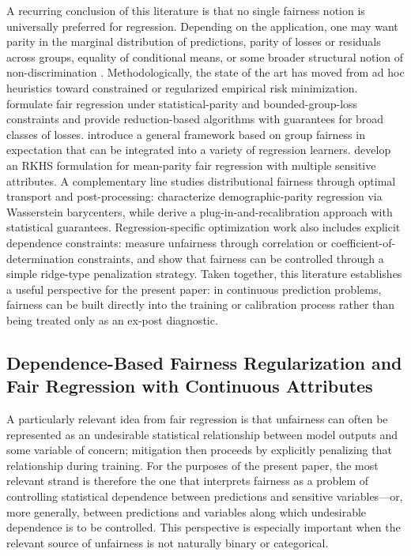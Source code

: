 \documentclass[12pt, draft]{article}
\theoremstyle{plain}
\theoremstyle{definition}
\newcommand{\1}{\mathbf{1}}
\begin{document}
A recurring conclusion of this literature is that no single fairness notion is universally preferred for regression. Depending on the application, one may want parity in the marginal distribution of predictions, parity of losses or residuals across groups, equality of conditional means, or some broader structural notion of non-discrimination \cite{AgarwalDudikWu2019,CatonHaas2024,BarocasHardtNarayanan2023}. Methodologically, the state of the art has moved from ad hoc heuristics toward constrained or regularized empirical risk minimization. \textcite{AgarwalDudikWu2019} formulate fair regression under statistical-parity and bounded-group-loss constraints and provide reduction-based algorithms with guarantees for broad classes of losses. \textcite{FitzsimonsEtAl2019} introduce a general framework based on group fairness in expectation that can be integrated into a variety of regression learners. \textcite{WeiEtAl2023} develop an RKHS formulation for mean-parity fair regression with multiple sensitive attributes. A complementary line studies distributional fairness through optimal transport and post-processing: \textcite{ChzhenEtAl2020Wasserstein} characterize demographic-parity regression via Wasserstein barycenters, while \textcite{ChzhenEtAl2020Recalibration} derive a plug-in-and-recalibration approach with statistical guarantees. Regression-specific optimization work also includes explicit dependence constraints: \textcite{KomiyamaEtAl2018} measure unfairness through correlation or coefficient-of-determination constraints, and \textcite{ScutariPaneroProissl2022} show that fairness can be controlled through a simple ridge-type penalization strategy. Taken together, this literature establishes a useful perspective for the present paper: in continuous prediction problems, fairness can be built directly into the training or calibration process rather than being treated only as an ex-post diagnostic.

\subsection{Dependence-Based Fairness Regularization and Fair Regression with Continuous Attributes}

A particularly relevant idea from fair regression is that unfairness can often be represented as an undesirable statistical relationship between model outputs and some variable of concern; mitigation then proceeds by explicitly penalizing that relationship during training. For the purposes of the present paper, the most relevant strand is therefore the one that interprets fairness as a problem of controlling statistical dependence between predictions and sensitive variables---or, more generally, between predictions and variables along which undesirable dependence is to be controlled. This perspective is especially important when the relevant source of unfairness is not naturally binary or categorical.
\end{document}
